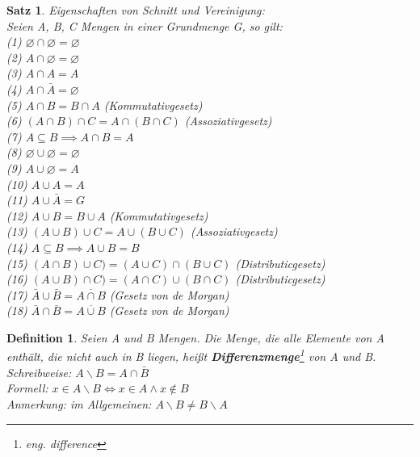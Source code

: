 \documentclass[12pt,german,a4]{article}
\begin{document}
\newtheorem{satz3}[satz]{Satz}
\begin{satz3}
Eigenschaften von Schnitt und Vereinigung:\\
Seien A, B, C Mengen in einer Grundmenge G, so gilt:\\
(1) $\varnothing \cap \varnothing = \varnothing$\\
(2) $A \cap \varnothing = \varnothing$\\
(3) $A \cap A = A$\\
(4) $A \cap \bar{A} = \varnothing$\\
(5) $A \cap B = B \cap A$ (Kommutativgesetz)\\
(6) $(A \cap B) \cap C = A \cap (B \cap C)$ (Assoziativgesetz)\\
(7) $A \subseteq B \implies A \cap B = A$\\
(8) $\varnothing \cup \varnothing = \varnothing$\\
(9) $A \cup \varnothing = A$\\
(10) $A \cup A = A$\\
(11) $A \cup \bar{A} = G$\\
(12) $A \cup B = B \cup A$ (Kommutativgesetz)\\
(13) $(A \cup B) \cup C = A \cup (B \cup C)$ (Assoziativgesetz)\\
(14) $A \subseteq B \implies A \cup B = B$\\
(15) $(A \cap B) \cup C) = (A \cup C) \cap (B \cup C)$ (Distributicgesetz)\\
(16) $(A \cup B) \cap C) = (A \cap C) \cup (B \cap C)$ (Distributicgesetz)\\
(17) $\bar{A} \cup \bar{B} = \overline{A \cap B}$ (Gesetz von de Morgan)\\
(18) $\bar{A} \cap \bar{B} = \overline{A \cup B}$ (Gesetz von de Morgan)
\end{satz3}

\newtheorem{defDifference}[defSet]{Definition}
\begin{defDifference}
Seien A und B Mengen. Die Menge, die alle Elemente von A enthält, die nicht auch in B liegen, heißt {\bf Differenzmenge}\footnote{eng. difference} von A und B.\\
Schreibweise: $A \backslash B = A \cap \bar{B}$\\
Formell: $x \in A \backslash B \Leftrightarrow x \in A \wedge x \not\in B$\\
Anmerkung: im Allgemeinen: $A \backslash B \neq B \backslash A$\\
\end{defDifference}
\end{document}
